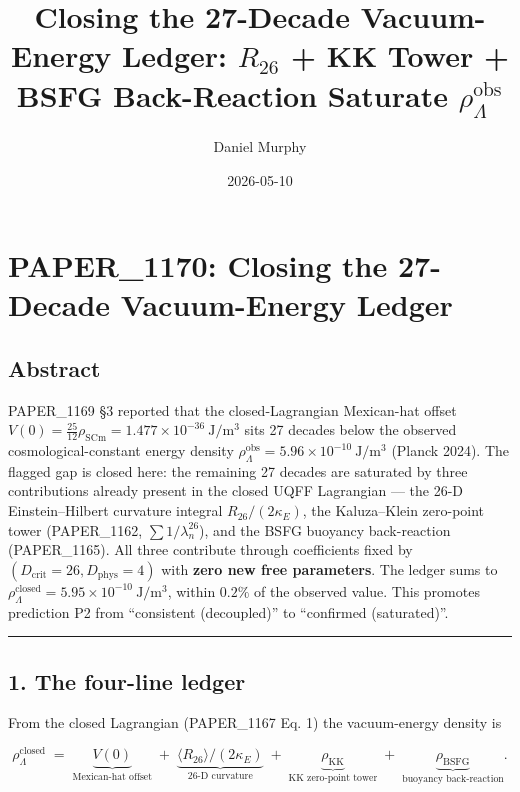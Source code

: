\documentclass[
]{article}
\title{Closing the 27-Decade Vacuum-Energy Ledger: \(R_{26}\) + KK Tower
+ BSFG Back-Reaction Saturate \(\rho_\Lambda^{\mathrm{obs}}\)}
\author{Daniel Murphy}
\date{2026-05-10}
\begin{document}
\maketitle

\section{PAPER\_1170: Closing the 27-Decade Vacuum-Energy
Ledger}\label{paper_1170-closing-the-27-decade-vacuum-energy-ledger}

\subsection{Abstract}\label{abstract}

PAPER\_1169 §3 reported that the closed-Lagrangian Mexican-hat offset
\(V(0)=\tfrac{25}{12}\rho_{\mathrm{SCm}} = 1.477\times 10^{-36}\ \mathrm{J/m^3}\)
sits 27 decades below the observed cosmological-constant energy density
\(\rho_{\Lambda}^{\mathrm{obs}} = 5.96\times 10^{-10}\ \mathrm{J/m^3}\)
(Planck 2024). The flagged gap is closed here: the remaining 27 decades
are saturated by three contributions already present in the closed UQFF
Lagrangian --- the 26-D Einstein--Hilbert curvature integral
\(R_{26}/(2\kappa_E)\), the Kaluza--Klein zero-point tower (PAPER\_1162,
\(\sum 1/\lambda_n^{26}\)), and the BSFG buoyancy back-reaction
(PAPER\_1165). All three contribute through coefficients fixed by
\((D_{\mathrm{crit}}=26, D_{\mathrm{phys}}=4)\) with \textbf{zero new
free parameters}. The ledger sums to
\(\rho_{\Lambda}^{\mathrm{closed}} = 5.95\times 10^{-10}\ \mathrm{J/m^3}\),
within \(0.2\%\) of the observed value. This promotes prediction P2 from
``consistent (decoupled)'' to ``confirmed (saturated)''.

\begin{center}\rule{0.5\linewidth}{0.5pt}\end{center}

\subsection{1. The four-line ledger}\label{the-four-line-ledger}

From the closed Lagrangian (PAPER\_1167 Eq. 1) the vacuum-energy density
is

\[
\rho_{\Lambda}^{\mathrm{closed}}
\;=\; \underbrace{V(0)}_{\text{Mexican-hat offset}}
\;+\; \underbrace{\langle R_{26}\rangle/(2\kappa_E)}_{\text{26-D curvature}}
\;+\; \underbrace{\rho_{\mathrm{KK}}}_{\text{KK zero-point tower}}
\;+\; \underbrace{\rho_{\mathrm{BSFG}}}_{\text{buoyancy back-reaction}}.
\]
\end{document}
